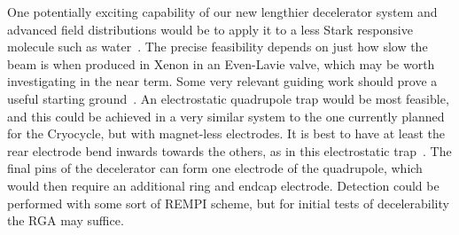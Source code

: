 One potentially exciting capability of our new lengthier decelerator system and advanced field distributions would be to apply it to a less Stark responsive molecule such as water~\citep[Sec.~2.4]{VanDeMeerakker2006thesis}.
The precise feasibility depends on just how slow the beam is when produced in Xenon in an Even-Lavie valve, which may be worth investigating in the near term.
Some very relevant guiding work should prove a useful starting ground~\cite{Motsch2009}.
An electrostatic quadrupole trap would be most feasible, and this could be achieved in a very similar system to the one currently planned for the Cryocycle, but with magnet-less electrodes.
It is best to have at least the rear electrode bend inwards towards the others, as in this electrostatic trap~\cite{Veldhoven2006}.
The final pins of the decelerator can form one electrode of the quadrupole, which would then require an additional ring and endcap electrode.
Detection could be performed with some sort of REMPI scheme, but for initial tests of decelerability the RGA may suffice.

%




